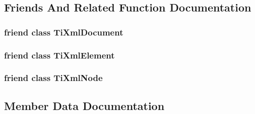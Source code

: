 \subsection{Friends And Related Function Documentation}
\subsubsection[{\texorpdfstring{Ti\+Xml\+Document}{TiXmlDocument}}]{\setlength{\rightskip}{0pt plus 5cm}friend class {\bf Ti\+Xml\+Document}\hspace{0.3cm}{\ttfamily [friend]}}\hypertarget{class_ti_xml_base_a173617f6dfe902cf484ce5552b950475}{}\label{class_ti_xml_base_a173617f6dfe902cf484ce5552b950475}
\subsubsection[{\texorpdfstring{Ti\+Xml\+Element}{TiXmlElement}}]{\setlength{\rightskip}{0pt plus 5cm}friend class {\bf Ti\+Xml\+Element}\hspace{0.3cm}{\ttfamily [friend]}}\hypertarget{class_ti_xml_base_ab6592e32cb9132be517cc12a70564c4b}{}\label{class_ti_xml_base_ab6592e32cb9132be517cc12a70564c4b}
\subsubsection[{\texorpdfstring{Ti\+Xml\+Node}{TiXmlNode}}]{\setlength{\rightskip}{0pt plus 5cm}friend class {\bf Ti\+Xml\+Node}\hspace{0.3cm}{\ttfamily [friend]}}\hypertarget{class_ti_xml_base_a218872a0d985ae30e78c55adc4bdb196}{}\label{class_ti_xml_base_a218872a0d985ae30e78c55adc4bdb196}


\subsection{Member Data Documentation}
